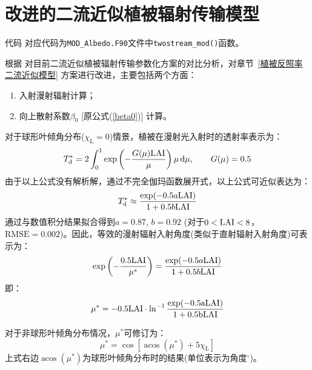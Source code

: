 \section{改进的二流近似植被辐射传输模型}\label{sec:改进的二流近似植被辐射传输模型}
\begin{mymdframed}{代码}
  对应代码为\texttt{MOD\_Albedo.F90}文件中\texttt{twostream\_mod()}函数。
\end{mymdframed}

根据 \citet{yuan2017reexamination} 对目前二流近似植被辐射传输参数化方案的对比分析，对章节~\ref{植被反照率二流近似模型} 方案进行改进，主要包括两个方面：
\begin{enumerate}
  \item 入射漫射辐射计算；
  \item 向上散射系数$\beta_0$ [原公式(\ref{beta0})] 计算。
\end{enumerate}

对于球形叶倾角分布($\chi_{\mathrm {L}}=0$)情景，植被在漫射光入射时的透射率表示为：
\begin{equation}
  T_{\mathrm{d}}^{*}=2 \int_{0}^{1} \exp \left(-\frac{G(\mu) \rm LAI}{\mu}\right) \mu\,{\mathrm d} \mu, \qquad G(\mu)=0.5
\end{equation}
由于以上公式没有解析解，通过不完全伽玛函数展开式，以上公式可近似表达为：
\begin{equation}
  T_{\mathrm{d}}^{*} \approx \frac{\exp (-0.5 a \rm LAI)}{1+0.5 b \rm LAI}
\end{equation}
通过与数值积分结果拟合得到$a=0.87$, $b=0.92$ (对于$0<\rm LAI<8$，$\mathrm{RMSE}=0.002$)。因此，等效的漫射辐射入射角度(类似于直射辐射入射角度)可表示为：
\begin{equation}
  \exp \left(-\frac{0.5 \rm LAI}{\mu^{*}}\right)=\frac{\exp (-0.5 a \rm LAI)}{1+0.5 b \rm LAI}
\end{equation}
即：
\begin{equation}
  \mu^{*}=-0.5 \rm LAI \cdot \ln ^{-1} \frac{\exp (-0.5 a \rm LAI)}{1+0.5 b \rm LAI}
\end{equation}

对于非球形叶倾角分布情况，$\mu^\ast$可修订为：
\begin{equation}
  \mu^{*}=\cos \left[\operatorname{acos}\left(\mu^{*}\right)+5 \chi_{\mathrm{L}}\right]
\end{equation}
上式右边$\operatorname{acos}\left(\mu^{*}\right)$为球形叶倾角分布时的结果(单位表示为角度$^{\circ}$)。


